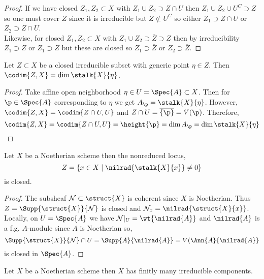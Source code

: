 \documentclass[12pt]{article}
\begin{document}
\begin{proof}
If we have closed $Z_1, Z_2 \subset X$ with $Z_1 \cup Z_2 \supset Z \cap U$ then $Z_1 \cup Z_2 \cup U^C \supset Z$ so one must cover $Z$ since it is irreducible but $Z \not\subset U^C$ so either $Z_1 \supset Z \cap U$ or $Z_2 \supset Z \cap U$.
\bigskip\\
Likewise, for closed $Z_1, Z_2 \subset X$ with $Z_1 \cup Z_2 \supset \overline{Z} \supset Z$ then by irreducibility $Z_1 \supset Z$ or $Z_1 \supset Z$ but these are closed so $Z_1 \supset \overline{Z}$ or $Z_2 \supset \overline{Z}$. 
\end{proof}

\begin{lemma} \label{codimension_loc_rings}
Let $Z \subset X$ be a closed irreducible subset with generic point $\eta \in Z$. Then $\codim{Z,X} = \dim{\stalk{X}{\eta}}$. 
\end{lemma}


\begin{proof}
Take affine open neighborhood $\eta \in U = \Spec{A} \subset X$. Then for $\p \in \Spec{A}$ corresponding to $\eta$ we get $A_\p = \stalk{X}{\eta}$. However, $\codim{Z, X} = \codim{Z \cap U, U}$ and $Z \cap U = \overline{\{ \p \}} = V(\p)$. Therefore,
\[ \codim{Z, X} = \codim{Z \cap U, U} = \height{\p} = \dim{A_\p} = \dim{\stalk{X}{\eta}} \]
\end{proof}

\begin{lemma}
Let $X$ be a Noetherian scheme then the nonreduced locus,
\[ Z = \{ x \in X \mid \nilrad{\stalk{X}{x}} \neq 0 \} \]
is closed.
\end{lemma} 

\begin{proof}
The subsheaf $\Nil \subset \struct{X}$ is coherent since $X$ is Noetherian. Thus $Z = \Supp{\struct{X}}{\Nil}$ is closed and $\Nil_x = \nilrad{\struct{X}{x}}$. Locally, on $U = \Spec{A}$ we have $\Nil |_U  = \wt{\nilrad{A}}$ and $\nilrad{A}$ is a f.g. $A$-module since $A$ is Noetherian so,
\[ \Supp{\struct{X}}{\Nil} \cap U = \Supp{A}{\nilrad{A}} = V(\Ann{A}{\nilrad{A}} \]
is closed in $\Spec{A}$. 
\end{proof}

\begin{lemma}
Let $X$ be a Noetherian scheme then $X$ has finitly many irreducible components.
\end{lemma}
\end{document}
